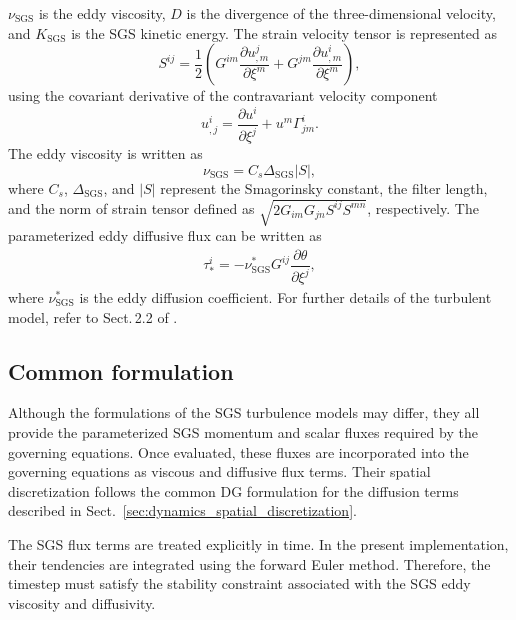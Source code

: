 $\nu_\textrm{SGS}$ is the eddy viscosity, 
$D$ is the divergence of the three-dimensional velocity, 
and 
$K_\textrm{SGS}$ is the SGS kinetic energy. 
The strain velocity tensor is represented as  
\begin{equation}
  S^{ij} = \dfrac{1}{2} 
  \left( G^{im} \dfrac{\partial u^j_{,m}}{\partial \xi^m} + G^{jm} \dfrac{\partial u^i_{,m}}{\partial \xi^m} \right), 
\end{equation}
using the covariant derivative of the contravariant velocity component 
\begin{equation}
  u^i_{,j} = \dfrac{\partial u^i}{\partial \xi^j} + u^m \Gamma^i_{jm}.
\end{equation}
The eddy viscosity is written as 
\begin{equation}
  \nu_\textrm{SGS} 
 = C_s \Delta_\textrm{SGS} |S|, 
\end{equation}
where 
$C_s$, $\Delta_\textrm{SGS}$, 
and $|S|$ represent the Smagorinsky constant, 
the filter length, 
and the norm of strain tensor defined as $\sqrt{2 G_{im}G_{jn}S^{ij}S^{mn}}$, respectively.
The parameterized eddy diffusive flux can be written 
as 
\begin{eqnarray}
  \tau_*^{i} = - \nu^*_\textrm{SGS} G^{ij} \dfrac{\partial \theta}{\partial \xi^j}, 
\end{eqnarray}
where 
$\nu^*_\textrm{SGS}$ is the eddy diffusion coefficient.  
For further details of the turbulent model, 
refer to Sect.\,2.2 of \cite{nishizawa2015influence}. 

\subsection{Common formulation}
Although the formulations of the SGS turbulence models may differ, 
they all provide the parameterized SGS momentum and scalar fluxes required by the governing equations.
Once evaluated, these fluxes are incorporated into the governing equations as viscous and diffusive flux terms.
Their spatial discretization follows the common DG formulation for the diffusion terms described in Sect.~\ref{sec:dynamics_spatial_discretization}.

The SGS flux terms are treated explicitly in time.
In the present implementation, their tendencies are integrated using the forward Euler method.
Therefore, the timestep must satisfy the stability constraint associated with the SGS eddy viscosity and diffusivity.